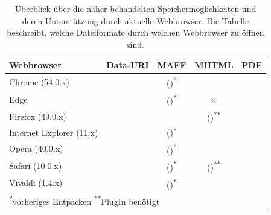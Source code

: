 \begin{table}[hbt]
\centering
\footnotesize
\begin{tabular}{lcccc}
	\toprule
	Webbrowser	& Data-URI & MAFF & MHTML & PDF \\
	\midrule
	Chrome (54.0.x) & \checkmark & (\checkmark)\textsuperscript{*} & \checkmark & \checkmark \\
	Edge & \checkmark & (\checkmark)\textsuperscript{*} & \boldmath$\times$ & \checkmark \\
	Firefox (49.0.x) & \checkmark & \checkmark & (\checkmark)\textsuperscript{**} & \checkmark \\
	Internet Explorer (11.x) & \checkmark & (\checkmark)$^*$ & \checkmark & \checkmark \\
	Opera (40.0.x) & \checkmark & (\checkmark)\textsuperscript{*} & \checkmark & \checkmark \\
	Safari (10.0.x) & \checkmark & (\checkmark)\textsuperscript{*} & (\checkmark)\textsuperscript{**} & \checkmark \\
	Vivaldi (1.4.x) & \checkmark & (\checkmark)\textsuperscript{*} & \checkmark & \checkmark \\
	\midrule
	\multicolumn{5}{l}{ \textsuperscript{*}vorheriges Entpacken \textsuperscript{**}PlugIn benötigt}\\

	\bottomrule 
\end{tabular}
\caption{Überblick über die näher behandelten Speichermöglichkeiten und deren Unterstützung durch aktuelle Webbrowser. Die Tabelle beschreibt, welche Dateiformate durch welchen Webbrowser zu öffnen sind.}
\label{tab:webseiteOeffnen}
\end{table}


